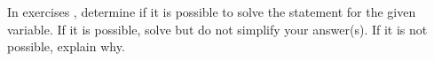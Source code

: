 {\noindent In exercises}
{, determine if it is possible to solve the statement for the given variable. If it is possible, solve but do not simplify your answer(s). If it is not possible, explain why.}
